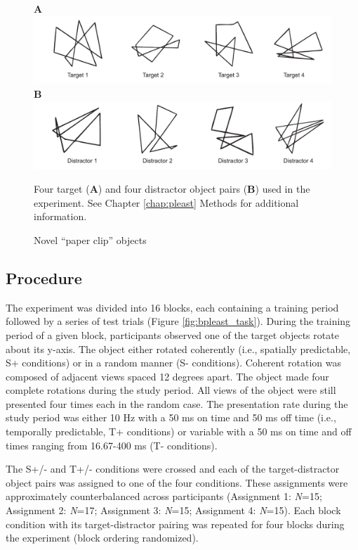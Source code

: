 \documentclass[dwyatte_dissertation.tex]{subfiles}
\begin{document}
\begin{figure}[h!]
\textbf{A} \\
\includegraphics[width=160mm]{figs/chap_bpleast/paperclip_targets.pdf} \\
\textbf{B} \\
\includegraphics[width=160mm]{figs/chap_bpleast/paperclip_distractors.pdf} \\
\caption{Novel ``paper clip'' objects}{Four target (\textbf{A}) and four distractor object pairs (\textbf{B}) used in the experiment. See Chapter \ref{chap:pleast} Methods for additional information.}
\label{fig:bpleast_objs}
\end{figure}

\subsection{Procedure}
The experiment was divided into 16 blocks, each containing a training period followed by a series of test trials (Figure \ref{fig:bpleast_task}). During the training period of a given block, participants observed one of the target objects rotate about its y-axis. The object either rotated coherently (i.e., spatially predictable, S+ conditions) or in a random manner (S- conditions). Coherent rotation was composed of adjacent views spaced 12 degrees apart. The object made four complete rotations during the study period. All views of the object were still presented four times each in the random case. The presentation rate during the study period was either 10 Hz with a 50 ms on time and 50 ms off time (i.e., temporally predictable, T+ conditions) or variable with a 50 ms on time and off times ranging from 16.67-400 ms (T- conditions). 

The S+/- and T+/- conditions were crossed and each of the target-distractor object pairs was assigned to one of the four conditions. These assignments were approximately counterbalanced across participants (Assignment 1: \textit{N}=15; Assignment 2: \textit{N}=17; Assignment 3: \textit{N}=15; Assignment 4: \textit{N}=15). Each block condition with its target-distractor pairing was repeated for four blocks during the experiment (block ordering randomized).
\end{document}
